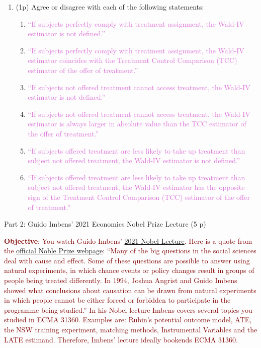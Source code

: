 \documentclass{article}
\begin{document}
\begin{enumerate}[label=\textbf{Q\arabic{enumi}}.,ref=Q\arabic{enumi}, wide=0pt, itemsep=0em, topsep=5pt, labelindent=0pt]
\item (1p) Agree or disagree with each of the following statements: 
\begin{enumerate}
\item \textcolor{Orchid}{``If subjects perfectly comply with treatment assignment, the Wald-IV estimator is not defined.''}
\item \textcolor{Orchid}{``If subjects perfectly comply with treatment assignment, the Wald-IV estimator coincides with the Treatment Control Comparison (TCC) estimator of the offer of treatment.''}
\item \textcolor{Orchid}{``If subjects not offered treatment cannot access treatment, the Wald-IV estimator is not defined.''}
\item \textcolor{Orchid}{``If subjects not offered treatment cannot access treatment, the Wald-IV estimator is always larger in absolute value than the TCC estimator of the offer of treatment.''}
\item \textcolor{Orchid}{``If subjects offered treatment are less likely to take up treatment than subject not offered treatment, the Wald-IV estimator is not defined.''}
\item \textcolor{Orchid}{``If subjects offered treatment are less likely to take up treatment than subject not offered treatment, the Wald-IV estimator has the opposite sign of the Treatment Control Comparison (TCC) estimator of the offer of treatment.''}
\end{enumerate}

\end{enumerate}
\newpage

\begin{center}
{\LARGE Part 2: Guido Imbens' 2021 Economics Nobel Prize Lecture (5 p)}
\end{center}

\noindent \textcolor{Maroon}{\textbf{Objective}: You watch Guido Imbens' \href{https://www.youtube.com/watch?v=yTrVg-t8O8A}{2021 Nobel Lecture}. Here is a quote from the \href{https://www.nobelprize.org/prizes/economic-sciences/2021/imbens/facts/}{official Noble Prize webpage}: ``Many of the big questions in the social sciences deal with cause and effect. Some of these questions are possible to answer using natural experiments, in which chance events or policy changes result in groups of people being treated differently. In 1994, Joshua Angrist and Guido Imbens showed what conclusions about causation can be drawn from natural experiments in which people cannot be either forced or forbidden to participate in the programme being studied.'' In his Nobel lecture Imbens covers several topics you studied in ECMA 31360. Examples are: Rubin's potential outcome model, ATE, the NSW training experiment, matching methods, Instrumental Variables and the LATE estimand. Therefore, Imbens' lecture ideally bookends ECMA 31360.}\\
\end{document}
